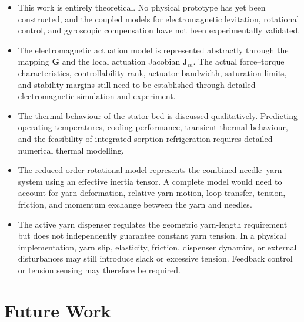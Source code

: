 \documentclass[12pt, a4paper]{article}
\begin{document}
\begin{itemize}

\item This work is entirely theoretical. No physical prototype has yet been constructed, and the coupled models for electromagnetic levitation, rotational control, and gyroscopic compensation have not been experimentally validated.

\item The electromagnetic actuation model is represented abstractly through the mapping $\mathbf{G}$ and the local actuation Jacobian $\mathbf{J}_m$. The actual force--torque characteristics, controllability rank, actuator bandwidth, saturation limits, and stability margins still need to be established through detailed electromagnetic simulation and experiment.

\item The thermal behaviour of the stator bed is discussed qualitatively. Predicting operating temperatures, cooling performance, transient thermal behaviour, and the feasibility of integrated sorption refrigeration requires detailed numerical thermal modelling.

\item The reduced-order rotational model represents the combined needle--yarn system using an effective inertia tensor. A complete model would need to account for yarn deformation, relative yarn motion, loop transfer, tension, friction, and momentum exchange between the yarn and needles.

\item The active yarn dispenser regulates the geometric yarn-length requirement but does not independently guarantee constant yarn tension. In a physical implementation, yarn slip, elasticity, friction, dispenser dynamics, or external disturbances may still introduce slack or excessive tension. Feedback control or tension sensing may therefore be required.

\end{itemize}

\section{Future Work}
\end{document}
